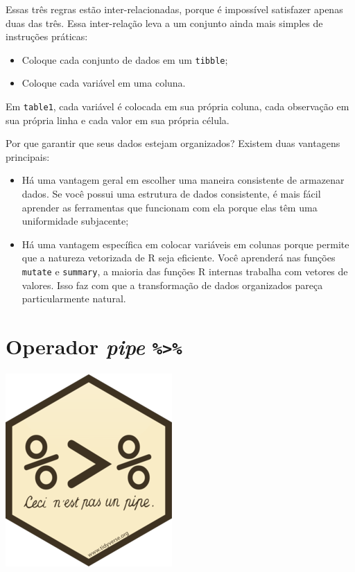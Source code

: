 \documentclass[]{book}
\begin{document}
Essas três regras estão inter-relacionadas, porque é impossível satisfazer apenas duas das três. Essa inter-relação leva a um conjunto ainda mais simples de instruções práticas:

\begin{itemize}
\item
  Coloque cada conjunto de dados em um \texttt{tibble};
\item
  Coloque cada variável em uma coluna.
\end{itemize}

Em \texttt{table1}, cada variável é colocada em sua própria coluna, cada observação em sua própria linha e cada valor em sua própria célula.

Por que garantir que seus dados estejam organizados? Existem duas vantagens principais:

\begin{itemize}
\item
  Há uma vantagem geral em escolher uma maneira consistente de armazenar dados. Se você possui uma estrutura de dados consistente, é mais fácil aprender as ferramentas que funcionam com ela porque elas têm uma uniformidade subjacente;
\item
  Há uma vantagem específica em colocar variáveis em colunas porque permite que a natureza vetorizada de R seja eficiente. Você aprenderá nas funções \texttt{mutate} e \texttt{summary}, a maioria das funções R internas trabalha com vetores de valores. Isso faz com que a transformação de dados organizados pareça particularmente natural.
\end{itemize}

\hypertarget{operador-pipe}{%
\section{\texorpdfstring{Operador \emph{pipe} \texttt{\%\textgreater{}\%}}{Operador pipe \%\textgreater\%}}\label{operador-pipe}}

\begin{center}\includegraphics[width=0.25\linewidth]{imagens/magritt} \end{center}
\end{document}
